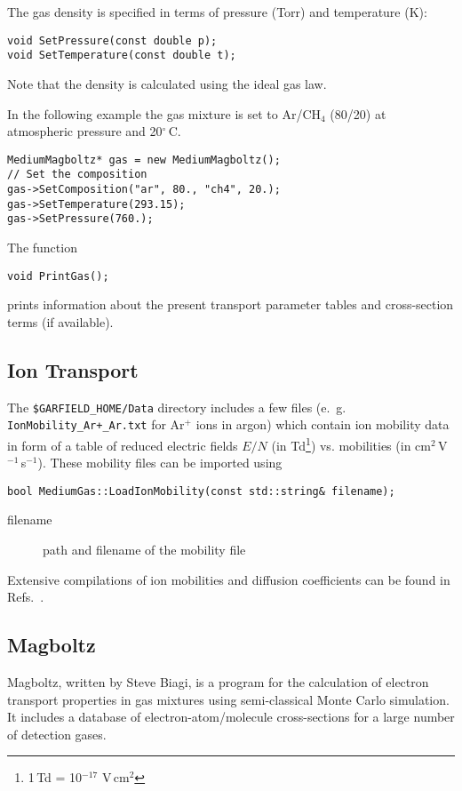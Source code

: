 The gas density is specified in terms of pressure (Torr) 
and temperature (K):
\begin{lstlisting}
void SetPressure(const double p);
void SetTemperature(const double t);
\end{lstlisting}
Note that the density is calculated using the ideal gas law. 

In the following example the gas mixture is set 
to Ar/CH\(_{4}\) (80/20) at 
atmospheric pressure and 20\(^{\circ}\)\,C.
\begin{lstlisting}
MediumMagboltz* gas = new MediumMagboltz();
// Set the composition
gas->SetComposition("ar", 80., "ch4", 20.);
gas->SetTemperature(293.15);
gas->SetPressure(760.);
\end{lstlisting}

The function
\begin{lstlisting}
void PrintGas();
\end{lstlisting}
prints information about the present transport parameter tables and 
cross-section terms (if available). 

\subsection{Ion Transport}

The \texttt{\$GARFIELD\_HOME/Data} directory includes a few files 
(e.~g. \texttt{IonMobility\_Ar+\_Ar.txt} for Ar\(^{+}\) ions in argon) 
which contain ion mobility data in form of 
a table of reduced electric fields \(E/N\) 
(in Td\footnote{1\,Td = 10\(^{-17}\) V\,cm\(^{2}\)}) vs. 
mobilities (in cm\(^{2}\)\,V\(^{-1}\)\,s\(^{-1}\)). 
These mobility files can be imported using
\begin{lstlisting}
bool MediumGas::LoadIonMobility(const std::string& filename);
\end{lstlisting}
\begin{description}
  \item[filename] path and filename of the mobility file
\end{description}
Extensive compilations of ion mobilities and diffusion coefficients 
can be found in Refs.~\cite{Ellis1976,Ellis1978,Ellis1984,Viehland1995}. 

\subsection{Magboltz}

Magboltz, written by Steve Biagi, is a program \cite{Biagi1999} 
for the calculation of electron transport properties in gas 
mixtures using semi-classical Monte Carlo simulation. 
It includes a database of electron-atom/molecule cross-sections 
for a large number of detection gases. 

